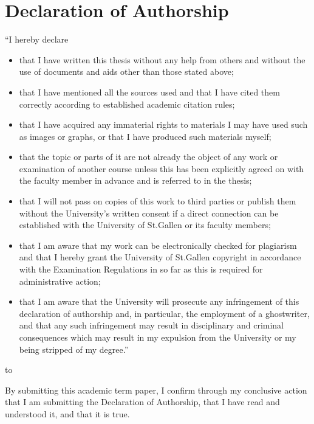 \section*{Declaration of Authorship}

“I hereby declare

\begin{itemize}
	\item that I have written this thesis without any help from others and without the use of documents and aids other than those stated above;
	\item that  I  have  mentioned  all  the  sources  used  and  that  I  have  cited  them  correctly according to established academic citation rules;
	\item that I have acquired any immaterial rights to materials I may have used such as images or graphs, or that I have produced such materials myself;
	\item that the topic or parts of it are not already the object of any work or examination of another course unless this has been explicitly agreed on with the faculty member in advance and is referred to in the thesis;
	\item that I will not pass on copies of this work to third parties or publish them without the University’s  written  consent  if  a  direct  connection  can  be  established  with  the University of St.Gallen or its faculty members;
	\item that I am aware that my work can be electronically checked for plagiarism and that I hereby grant the University of St.Gallen copyright in accordance with the Examination Regulations in so far as this is required for administrative action;
	\item that I am aware that the University will prosecute any infringement of this declaration of authorship and, in particular, the employment of a ghostwriter, and that any such infringement may result in disciplinary and criminal consequences which may result in my expulsion from the University or my being stripped of my degree.”
\end{itemize}

\newcommand{\textfield}[2]{
  \vbox{
    \hsize=#1\kern2cm\hrule\kern1ex
    \hbox to \hsize{\strut\hfil\footnotesize#2\hfil}
  }
}
\hbox to \hsize{\textfield{4cm}{Date}\hfil\hfil\textfield{7cm}{Signature}}

By submitting this academic term paper, I confirm through my conclusive action that I am submitting the Declaration of Authorship, that I have read and understood it, and that it is true.

\newpage
